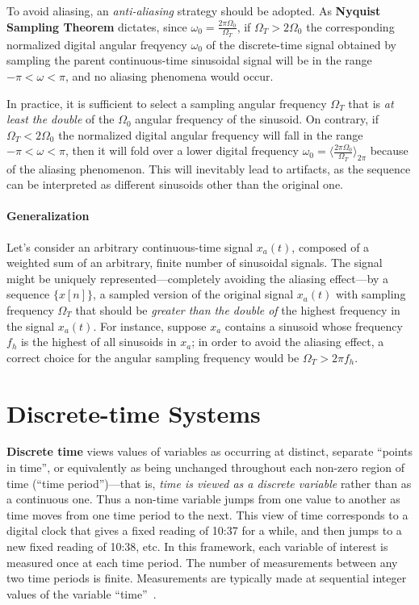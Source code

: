 \documentclass[\documentfontsize, twocolumn]{\classname}
\begin{document}
To avoid aliasing, an \emph{anti-aliasing} strategy should be adopted. As \textbf{Nyquist Sampling Theorem} dictates, since $\omega_0 = \frac{2\pi \Omega_0}{\Omega_T}$, if $\Omega_T > 2\Omega_0$ the corresponding normalized digital angular freqyency $\omega_0$ of the discrete-time signal obtained by sampling the parent continuous-time sinusoidal signal will be in the range $-\pi < \omega < \pi$, and no aliasing phenomena would occur.  

In practice, it is sufficient to select a sampling angular frequency $\Omega_T$ that is \emph{at least the double} of the $\Omega_0$ angular frequency of the sinusoid. On contrary, if $\Omega_T < 2\Omega_0$ the normalized digital angular frequency will fall in the range $-\pi < \omega < \pi$, then it will fold over a lower digital frequency $\omega_0 = \langle \frac{2 \pi \Omega_0 }{\Omega_T}\rangle_{2\pi}$ because of the aliasing phenomenon. This will inevitably lead to artifacts, as the sequence can be interpreted as different sinusoids other than the original one.

\subsubsection{Generalization}

Let's consider an arbitrary continuous-time signal $x_a(t)$, composed of a weighted sum of an arbitrary, finite number of sinusoidal signals. The signal might be uniquely represented---completely avoiding the aliasing effect---by a sequence $\{x[n]\}$, a sampled version of the original signal $x_a(t)$ with sampling frequency $\Omega_T$ that should be \emph{greater than the double of} the highest frequency in the signal $x_a(t)$. For instance, suppose $x_a$ contains a sinusoid whose frequency $f_h$ is the highest of all sinusoids in $x_a$; in order to avoid the aliasing effect, a correct choice for the angular sampling frequency would be $\Omega_T > 2\pi f_h$.

\chapter{Discrete-time Systems}

\textbf{Discrete time} views values of variables as occurring at distinct, separate ``points in time'', or equivalently as being unchanged throughout each non-zero region of time (``time pe\-ri\-od'')---that is, \emph{time is viewed as a discrete variable} rather than as a continuous one. Thus a non-time variable jumps from one value to another as time moves from one time period to the next. This view of time corresponds to a digital clock that gives a fixed reading of 10:37 for a while, and then jumps to a new fixed reading of 10:38, etc. In this framework, each variable of interest is measured once at each time period. The number of measurements between any two time periods is finite. Measurements are typically made at sequential integer values of the variable ``time''~\cite{bib:discreteTimeSystems}.
\end{document}
